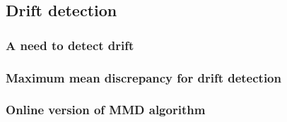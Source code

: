 \subsection{Drift detection}
    \subsubsection{A need to detect drift}
    \subsubsection{Maximum mean discrepancy for drift detection}
        
    \subsubsection{Online version of MMD algorithm}
            